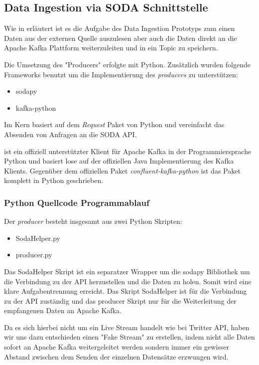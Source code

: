 \subsection{Data Ingestion via \acs{SODA} Schnittstelle}
Wie in  erläutert ist es die Aufgabe des Data Ingestion Prototyps zum einen Daten aus der externen Quelle auszulesen
aber auch die Daten direkt an die Apache Kafka Plattform weiterzuleiten und in ein Topic zu speichern.

Die Umsetzung des "Producers" erfolgte mit Python.
Zusätzlich wurden folgende Frameworks benutzt um die Implementierung des \textit{producers} zu unterstützen:

\begin{itemize}
  \item sodapy
  \item kafka-python
\end{itemize}

Im Kern basiert  auf dem \textit{Request} Paket von Python und vereinfacht das Absenden von Anfragen an die \ac{SODA} \ac{API}.\autocite{Sodapy}

 ist ein offiziell unterstützter Klient für Apache Kafka in der Programmiersprache Python und basiert lose auf der offiziellen Java Implementierung des Kafka Klients.\autocite{KafkaPython}
Gegenüber dem offiziellen Paket \textit{confluent-kafka-python} ist das Paket  komplett in Python geschrieben.\autocite{KafkaClients}

\subsubsection{Python Quellcode Programmablauf}
Der \textit{producer} besteht insgesamt aus zwei Python Skripten:

\begin{itemize}
  \item SodaHelper.py
  \item producer.py
\end{itemize}

Das SodaHelper Skript ist ein separatzer Wrapper um die sodapy Bibliothek um die Verbindung zu der \ac{API} herzustellen und die Daten zu holen.
Somit wird eine klare Aufgabentrennung erreicht.
Das Skript SodaHelper ist für die Verbindung zu der \ac{API} zuständig und das producer Skript nur für die Weiterleitung der empfangenen Daten an Apache Kafka.

Da es sich hierbei nicht um ein Live Stream handelt wie \zb{} bei Twitter \ac{API}, haben wir uns dazu entschieden einen "Fake Stream" zu erstellen,
indem nicht alle Daten sofort an Apache Kafka weitergeleitet werden sondern immer ein gewisser Abstand zwischen dem Senden der einzelnen Datensätze
erzwungen wird.

